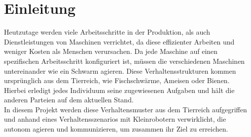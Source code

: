 \section{Einleitung}

Heutzutage werden viele Arbeitsschritte in der Produktion, als auch Dienstleistungen von Maschinen verrichtet, da diese effizienter Arbeiten und weniger Kosten als Menschen verursachen. Da jede Maschine auf einen spezifischen Arbeitsschritt konfiguriert ist, müssen die verschiedenen Maschinen untereinander wie ein Schwarm agieren. Diese Verhaltensstrukturen kommen ursprünglich aus dem Tierreich, wie Fischschwärme, Ameisen oder Bienen. Hierbei erledigt jedes Individuum seine zugewiesenen Aufgaben und hält die anderen Parteien auf dem aktuellen Stand.\\
In diesem Projekt werden diese Verhaltensmuster aus dem Tierreich aufgegriffen und anhand eines Verhaltensszenarios mit Kleinrobotern verwirklicht, die autonom agieren und kommunizieren, um zusammen ihr Ziel zu erreichen.\\